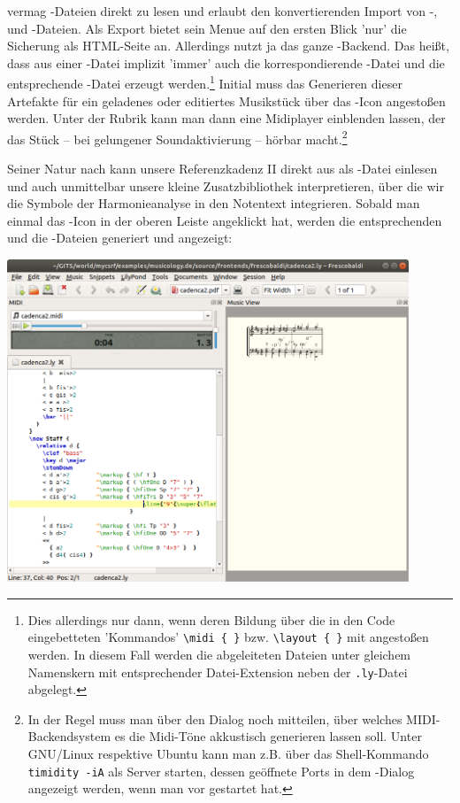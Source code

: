  vermag -Dateien direkt zu lesen und erlaubt den
konvertierenden Import von -,  und -Dateien.
Als Export bietet sein Menue auf den ersten Blick 'nur' die Sicherung als
HTML-Seite an. Allerdings nutzt  ja das ganze
-Backend. Das heißt, dass aus einer -Datei implizit
'immer' auch die korrespondierende -Datei und die entsprechende
-Datei erzeugt werden.\footnote{Dies allerdings nur dann, wenn deren
Bildung über die in den Code eingebetteten 'Kommandos'
\texttt{{\textbackslash}midi \{ \}} bzw.
\texttt{{\textbackslash}layout \{ \}} mit angestoßen werden. In diesem Fall
werden die abgeleiteten Dateien unter gleichem Namenskern mit entsprechender
Datei-Extension neben der \texttt{.ly}-Datei abgelegt.} Initial muss das
Generieren dieser Artefakte für ein geladenes oder editiertes Musikstück über
das -Icon angestoßen werden. Unter der Rubrik  kann man
dann eine Midiplayer einblenden lassen, der das Stück -- bei gelungener
Soundaktivierung -- hörbar macht.\footnote{In der Regel muss man
 über den Dialog  noch mitteilen,
über welches MIDI-Backendsystem es die Midi-Töne akkustisch generieren lassen
soll. Unter GNU/Linux respektive Ubuntu kann man z.B.  über das
Shell-Kommando \texttt{timidity -iA} als Server starten, dessen geöffnete Ports
in dem -Dialog angezeigt werden, wenn man  vor
 gestartet hat.}

Seiner Natur nach kann  unsere Referenzkadenz II direkt aus als
-Datei einlesen und auch unmittelbar unsere kleine
Zusatzbibliothek interpretieren, über die wir die Symbole der Harmonieanalyse in
den Notentext integrieren. Sobald man einmal das -Icon in der
oberen Leiste angeklickt hat, werden die entsprechenden  und die
-Dateien generiert und angezeigt:

\begin{center}
\includegraphics[width=0.9\textwidth]{frontends/frescobaldi/frescobaldi-cadenca2-300dpi.png}
\end{center}

